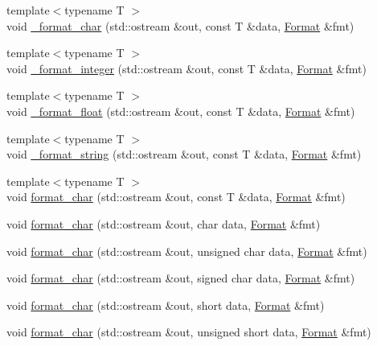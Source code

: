 \begin{DoxyCompactItemize}
\item 
{\footnotesize template$<$typename T $>$ }\\void \hyperlink{namespacecp_a94c381cbbf87a4688d2f47e52e03b867}{\_\-format\_\-char} (std::ostream \&out, const T \&data, \hyperlink{structcp_1_1Format}{Format} \&fmt)
\item 
{\footnotesize template$<$typename T $>$ }\\void \hyperlink{namespacecp_a5341cb723c5abcaf856cbdf65e182885}{\_\-format\_\-integer} (std::ostream \&out, const T \&data, \hyperlink{structcp_1_1Format}{Format} \&fmt)
\item 
{\footnotesize template$<$typename T $>$ }\\void \hyperlink{namespacecp_a9eacdefc85b69ce28ce1ba0d7e180db1}{\_\-format\_\-float} (std::ostream \&out, const T \&data, \hyperlink{structcp_1_1Format}{Format} \&fmt)
\item 
{\footnotesize template$<$typename T $>$ }\\void \hyperlink{namespacecp_a9c55f61eeac5536687ef506f543968de}{\_\-format\_\-string} (std::ostream \&out, const T \&data, \hyperlink{structcp_1_1Format}{Format} \&fmt)
\item 
{\footnotesize template$<$typename T $>$ }\\void \hyperlink{namespacecp_a6da87dd806888f3952a6a1b0097f86cf}{format\_\-char} (std::ostream \&out, const T \&data, \hyperlink{structcp_1_1Format}{Format} \&fmt)
\item 
void \hyperlink{namespacecp_aae138ed98d6c597a9af56b153e268eae}{format\_\-char} (std::ostream \&out, char data, \hyperlink{structcp_1_1Format}{Format} \&fmt)
\item 
void \hyperlink{namespacecp_aa4f0b57ce9dab1bd82680699afbb9fec}{format\_\-char} (std::ostream \&out, unsigned char data, \hyperlink{structcp_1_1Format}{Format} \&fmt)
\item 
void \hyperlink{namespacecp_acc4c174685064092b17978375387358a}{format\_\-char} (std::ostream \&out, signed char data, \hyperlink{structcp_1_1Format}{Format} \&fmt)
\item 
void \hyperlink{namespacecp_a9f48feafb852220f8e2baa551abca2af}{format\_\-char} (std::ostream \&out, short data, \hyperlink{structcp_1_1Format}{Format} \&fmt)
\item 
void \hyperlink{namespacecp_a692ac8f80fe2d8f482bd1c6cc4518219}{format\_\-char} (std::ostream \&out, unsigned short data, \hyperlink{structcp_1_1Format}{Format} \&fmt)

\end{DoxyCompactItemize}

